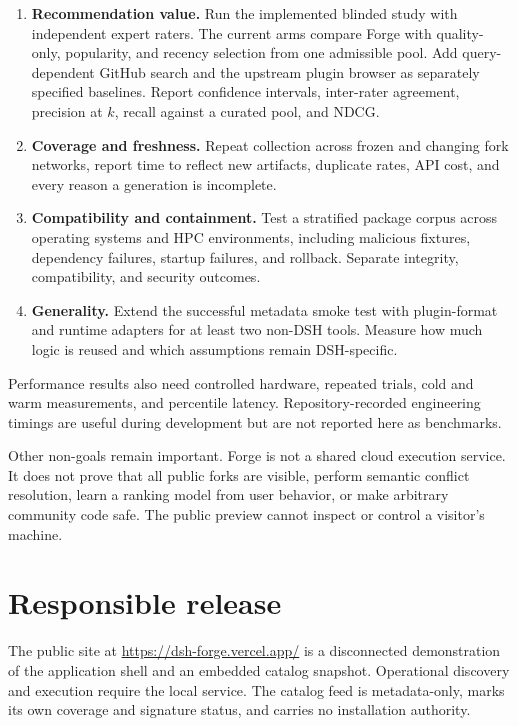 \documentclass[10pt,twocolumn]{article}
\begin{document}
\begin{enumerate}
\item \textbf{Recommendation value.} Run the implemented blinded study with independent expert raters. The current arms compare Forge with quality-only, popularity, and recency selection from one admissible pool. Add query-dependent GitHub search and the upstream plugin browser as separately specified baselines. Report confidence intervals, inter-rater agreement, precision at $k$, recall against a curated pool, and NDCG.
\item \textbf{Coverage and freshness.} Repeat collection across frozen and changing fork networks, report time to reflect new artifacts, duplicate rates, API cost, and every reason a generation is incomplete.
\item \textbf{Compatibility and containment.} Test a stratified package corpus across operating systems and HPC environments, including malicious fixtures, dependency failures, startup failures, and rollback. Separate integrity, compatibility, and security outcomes.
\item \textbf{Generality.} Extend the successful metadata smoke test with plugin-format and runtime adapters for at least two non-DSH tools. Measure how much logic is reused and which assumptions remain DSH-specific.
\end{enumerate}

Performance results also need controlled hardware, repeated trials, cold and warm measurements, and percentile latency. Repository-recorded engineering timings are useful during development but are not reported here as benchmarks.

Other non-goals remain important. Forge is not a shared cloud execution service. It does not prove that all public forks are visible, perform semantic conflict resolution, learn a ranking model from user behavior, or make arbitrary community code safe. The public preview cannot inspect or control a visitor's machine.

\section{Responsible release}

The public site at \url{https://dsh-forge.vercel.app/} is a disconnected demonstration of the application shell and an embedded catalog snapshot. Operational discovery and execution require the local service. The catalog feed is metadata-only, marks its own coverage and signature status, and carries no installation authority.\cite{readme,feedrelease}
\end{document}
